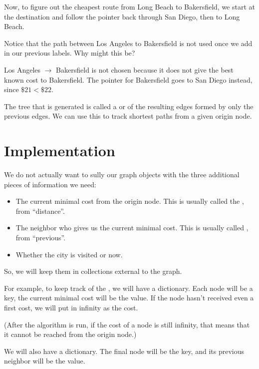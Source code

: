 Now, to figure out the cheapest route from Long Beach to Bakersfield,
we start at the destination and follow the  pointer back
through San Diego, then to Long Beach. 
\begin{Exercise}[title={Expanding on the Delivery Graph}, label={ex:deliv_1}]
Notice that the path between Los Angeles to Bakersfield is not used once we add in our previous labels. Why might this be?
\end{Exercise}
\begin{Answer}[ref={ex:deliv_1}]
Los Angeles $\rightarrow$ Bakersfield is not chosen because it does not give the best known cost to Bakersfield. The  pointer for Bakersfield goes to San Diego instead, since $\mathdollar21 < \mathdollar22$.

The tree that is generated is called a  or  of the resulting edges formed by only the previous edges. We can use this to track shortest paths from a given origin node.
\end{Answer}
\section{Implementation}

We do not actually want to sully our graph objects with the three additional pieces of information we need:
\begin{itemize}
    \item The current minimal cost from the origin node. This is usually
          called the , from ``distance''.
    \item The neighbor who gives us the current minimal cost. This is
          usually called , from ``previous''.
    \item Whether the city is visited or now.
\end{itemize}
So, we will keep them in collections external to the graph.

For example, to keep track of the , we will have a
 dictionary. Each node will be a key, the current minimal
cost will be the value.  If the node hasn't received even a first
cost, we will put in infinity as the cost.

(After the algorithm is run, if the cost of a node is still infinity,
that means that it cannot be reached from the origin node.)

We will also have a  dictionary. The final node will be
the key, and its previous neighbor will be the value.


